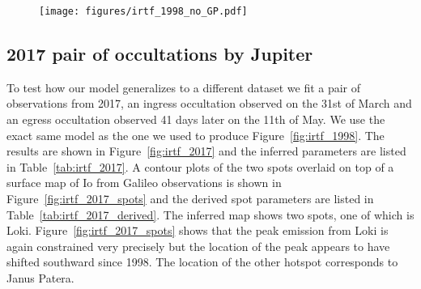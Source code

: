\documentclass[modern]{aastex62}
\begin{document}
\begin{figure}[t!]
    \begin{centering}
    \texttt{[image: figures/irtf\_1998\_no\_GP.pdf]}
    \end{centering}
\end{figure}


\subsection{2017 pair of occultations by Jupiter}
To test how our model generalizes to a different dataset we fit a pair of observations from 2017, an ingress occultation observed on the 31st of March and an egress occultation observed 41 days later on the 11th of May.
We use the exact same model as the one we used to produce Figure~\ref{fig:irtf_1998}.
The results are shown in Figure~\ref{fig:irtf_2017} and the inferred parameters are listed in Table~\ref{tab:irtf_2017}.
A contour plots of the two spots overlaid on top of a surface map of Io from Galileo observations is shown in Figure~\ref{fig:irtf_2017_spots} and the derived spot parameters are listed in Table~\ref{tab:irtf_2017_derived}.
The inferred map shows two spots, one of which is Loki. 
Figure~\ref{fig:irtf_2017_spots} shows that the peak emission from Loki is again constrained very precisely but the location of the peak appears to have shifted southward since 1998.
The location of the other hotspot corresponds to Janus Patera.
\end{document}
